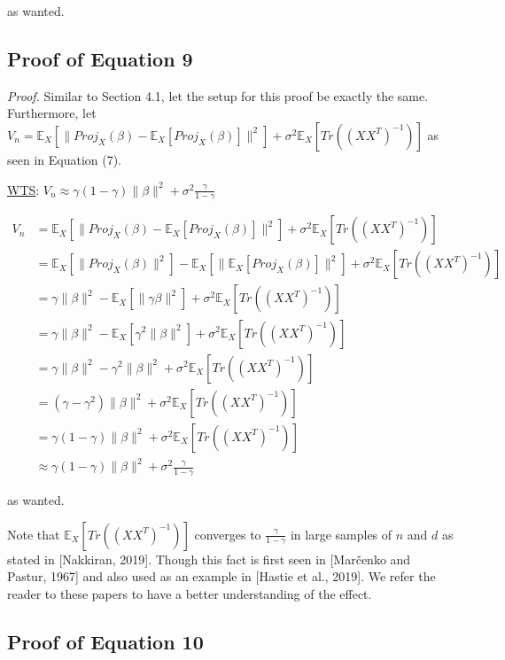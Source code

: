 \documentclass{article}
\begin{document}
as wanted.

\subsection{Proof of Equation 9}

\emph{Proof.}
Similar to Section 4.1, let the setup for this proof be exactly the same. Furthermore, let $V_n =  \mathbb{E}_X [\|Proj_{X} (\beta) - \mathbb{E}_X [Proj_X (\beta)]\|^2] + \sigma^2 \mathbb{E}_X [Tr((XX^T)^{-1})]$ as seen in Equation (7).

\underline{WTS}: $V_n \approx \gamma(1-\gamma) \|\beta\|^2 + \sigma^2 \frac{\gamma}{1-\gamma}$

\begin{align*}
    V_n &= \mathbb{E}_X [\|Proj_{X} (\beta) - \mathbb{E}_X [Proj_X (\beta)]\|^2] + \sigma^2 \mathbb{E}_X [Tr((XX^T)^{-1})]\\
    &= \mathbb{E}_X [\|Proj_X (\beta)\|^2] - \mathbb{E}_X [\| \mathbb{E}_X [Proj_X (\beta)]\|^2] + \sigma^2 \mathbb{E}_X [Tr((XX^T)^{-1})]\\
    &= \gamma\|\beta\|^2 - \mathbb{E}_X [\|\gamma\beta\|^2] + \sigma^2 \mathbb{E}_X [Tr((XX^T)^{-1})]\\
    &= \gamma\|\beta\|^2 - \mathbb{E}_X [\gamma^2 \|\beta\|^2] + \sigma^2 \mathbb{E}_X [Tr((XX^T)^{-1})]\\
    &= \gamma\|\beta\|^2 - \gamma^2\|\beta\|^2 + \sigma^2 \mathbb{E}_X [Tr((XX^T)^{-1})]\\
    &= (\gamma - \gamma^2) \|\beta\|^2 + \sigma^2 \mathbb{E}_X [Tr((XX^T)^{-1})]\\
    &= \gamma(1-\gamma) \|\beta\|^2 + \sigma^2 \mathbb{E}_X [Tr((XX^T)^{-1})]\\
    &\approx \gamma(1-\gamma) \|\beta\|^2 + \sigma^2 \frac{\gamma}{1-\gamma}
\end{align*}

as wanted.

Note that $\mathbb{E}_X [Tr((XX^T)^{-1})]$ converges to $ \frac{\gamma}{1-\gamma}$ in large samples of $n$ and $d$ as stated in [Nakkiran, 2019]. Though this fact is first seen in [Marčenko and Pastur, 1967] and also used as an example in [Hastie et al., 2019]. We refer the reader to these papers to have a better understanding of the effect.



\subsection{Proof of Equation 10}
\end{document}
